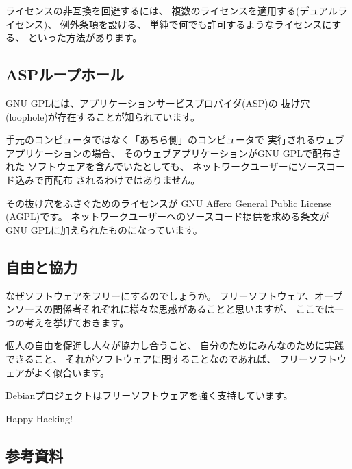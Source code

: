 \documentclass[mingoth,a4paper]{jsarticle}
\begin{document}
ライセンスの非互換を回避するには、
複数のライセンスを適用する(デュアルライセンス)、
例外条項を設ける、
単純で何でも許可するようなライセンスにする、
といった方法があります。

\subsection{ASPループホール}

GNU GPLには、アプリケーションサービスプロバイダ(ASP)の
抜け穴(loophole)が存在することが知られています。

手元のコンピュータではなく「あちら側」のコンピュータで
実行されるウェブアプリケーションの場合、
そのウェブアプリケーションがGNU GPLで配布された
ソフトウェアを含んでいたとしても、
ネットワークユーザーにソースコード込みで再配布
されるわけではありません。

その抜け穴をふさぐためのライセンスが
GNU Affero General Public License (AGPL)です。
ネットワークユーザーへのソースコード提供を求める条文が
GNU GPLに加えられたものになっています。

\subsection{自由と協力}

なぜソフトウェアをフリーにするのでしょうか。
フリーソフトウェア、オープンソースの関係者それぞれに様々な思惑があることと思いますが、
ここでは一つの考えを挙げておきます。

個人の自由を促進し人々が協力し合うこと、
自分のためにみんなのために実践できること、
それがソフトウェアに関することなのであれば、
フリーソフトウェアがよく似合います。

Debianプロジェクトはフリーソフトウェアを強く支持しています。

Happy Hacking!

\newpage
\subsection{参考資料}
\end{document}
